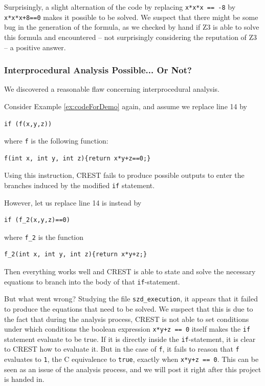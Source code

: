 \documentclass[oribibl, twocolumn]{llncs}
\begin{document}
Surprisingly, a slight alternation of the code by replacing \texttt{x*x*x == -8} by \texttt{x*x*x+8==0} makes it possible to be solved. We suspect that there might be some bug in the generation of the formula, as we checked by hand if \textsc{Z3} is able to solve this formula and encountered -- not surprisingly considering the reputation of \textsc{Z3} -- a positive answer.
\subsubsection{Interprocedural Analysis Possible... Or Not?}

We discovered a reasonable flaw concerning interprocedural analysis.

Consider Example \ref{ex:codeForDemo} again, and assume we replace
line 14 by
\begin{verbatim}
if (f(x,y,z))
\end{verbatim}
where \texttt{f} is the following function:
\begin{verbatim}
f(int x, int y, int z){return x*y+z==0;}
\end{verbatim}

Using this instruction, \textsc{CREST} fails to produce possible
outputs to enter the branches induced by the modified \texttt{if}
statement.

However, let us replace line 14 is instead by

\begin{verbatim}
if (f_2(x,y,z)==0)
\end{verbatim}

where \texttt{f\_2} is the function
\begin{verbatim}
f_2(int x, int y, int z){return x*y+z;}
\end{verbatim}

Then everything works well and \textsc{CREST} is able to state and
solve the necessary equations to branch into the body of that \texttt{if}-statement.

But what went wrong? Studying the file \texttt{szd\_execution}, it
appears that it failed to produce the equations that need to be
solved. We suspect that this is due to the fact that during the
analysis process, \textsc{CREST} is not able to set conditions under
which conditions the boolean expression \texttt{x*y+z == 0} itself makes the
\texttt{if} statement evaluate to be true. If it is directly inside
the \texttt{if}-statement, it is clear to \textsc{CREST} how to
evaluate it. But in the case of \texttt{f}, it fails to reason that
\texttt{f} evaluates to
\texttt{1}, the \textsc{C} equivalence to \texttt{true}, exactly when \texttt{x*y+z == 0}.
This can be seen as an issue of the analysis process, and we will post
it right after this project is handed in.
\end{document}
